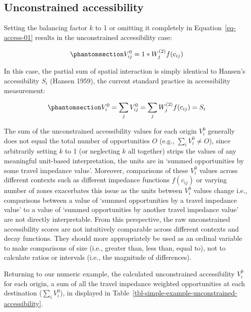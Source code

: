 \documentclass[
]{article}
\begin{document}
\subsection{Unconstrained
accessibility}\label{unconstrained-accessibility}

Setting the balancing factor \(k\) to 1 or omitting it completely in
Equation~\ref{eq-access-01} results in the unconstrained accessibility
case:

\begin{equation}\phantomsection\label{eq-unconstrained-access}{
V^0_{ij} = 1 *W_j^{(2)} f(c_{ij})
}\end{equation}

In this case, the partial sum of spatial interaction is simply identical
to Hansen's accessibility \(S_i\) (Hansen 1959), the current standard
practice in accessibility measurement:

\begin{equation}\phantomsection\label{eq-unconstrained-accessibility}{
V^0_i = \sum_j V^0_{ij} = \sum_j W^{(2)}_jf(c_{ij}) = S_i
}\end{equation}

The sum of the unconstrained accessibility values for each origin
\(V^0_{i}\) generally does not equal the total number of opportunities
\(O\) (e.g., \(\sum_i V^0_{i} \not= O\)), since arbitrarily setting
\(k\) to 1 (or neglecting \(k\) all together) strips the values of any
meaningful unit-based interpretation, the units are in `summed
opportunities by some travel impedance value'. Moreover, comparisons of
these \(V^0_{i}\) values across different contexts such as different
impedance functions \(f(c_{ij})\) or varying number of zones exacerbates
this issue as the units between \(V^0_{i}\) values change i.e.,
comparisons between a value of `summed opportunities by a travel
impedance value' to a value of `summed opportunities by another travel
impedance value' are not directly interpretable. From this perspective,
the raw unconstrained accessibility scores are not intuitively
comparable across different contexts and decay functions. They should
more appropriately be used as an ordinal variable to make comparisons of
size (i.e., greater than, less than, equal to), not to calculate ratios
or intervals (i.e., the magnitude of differences).

Returning to our numeric example, the calculated unconstrained
accessibility \(V^0_{i}\) for each origin, a sum of all the travel
impedance weighted opportunities at each destination
(\(\sum_i V^0_{i}\)), in displayed in
Table~\ref{tbl-simple-example-unconstrained-accessibility}.
\end{document}
